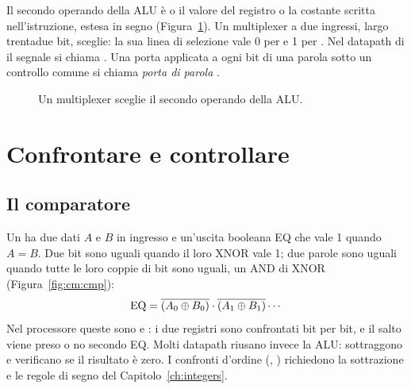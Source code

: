\begin{prgmachine}
Il secondo operando della ALU è o il valore del registro  o la
costante scritta nell'istruzione, estesa in segno
(Figura~\ref{fig:cm:alusrc}). Un multiplexer a due ingressi, largo trentadue
bit, sceglie: la sua linea di selezione vale 0 per  e 1 per
. Nel datapath di \citet{patterson2020} il segnale si chiama
. Una porta applicata a ogni bit di una parola sotto un controllo
comune si chiama \emph{porta di parola} .
\end{prgmachine}

\begin{figure}[htb]
\centering
{}
\caption{Un multiplexer sceglie il secondo operando della ALU.}
\label{fig:cm:alusrc}
\end{figure}

\section{Confrontare e controllare}

\subsection{Il comparatore}

Un  ha due dati $A$ e $B$ in ingresso e un'uscita booleana EQ
che vale 1 quando $A=B$. Due bit sono uguali quando il loro XNOR vale 1; due
parole sono uguali quando tutte le loro coppie di bit sono uguali, un AND di
XNOR (Figura~\ref{fig:cm:cmp}):
\[ \mathrm{EQ}=\overline{(A_0\oplus B_0)}\cdot\overline{(A_1\oplus B_1)}\cdots \]
Nel processore queste sono  e : i due registri sono
confrontati bit per bit, e il salto viene preso o no secondo EQ. Molti datapath
riusano invece la ALU: sottraggono e verificano se il risultato è zero. I
confronti d'ordine (, ) richiedono la sottrazione e le regole
di segno del Capitolo~\ref{ch:integers}.

